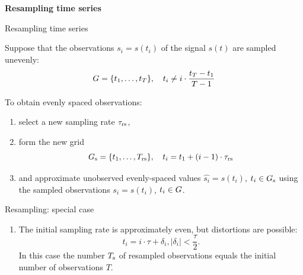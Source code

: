 \documentclass{beamer}
\begin{document}
\begin{frame}
\vfill
\begin{center}
{\Large \bf Resampling time series}
\end{center}
\vfill
\end{frame}
\begin{frame}{Resampling time series}

Suppose that the observations $s_i = s(t_i)$ of the signal $s(t)$ are sampled unevenly:
\[G = \{t_1, \dots, t_T\}, \quad t_i \neq i\cdot\frac{t_T - t_1}{T-1} \]

\bigskip

To obtain evenly spaced observations:
\begin{enumerate}[1)]
\item select a new sampling rate $\tau_{\text{rs}}$,
\item form the new grid
\[G_{\text{s}} = \{t_1, \dots, T_{\text{rs}} \}, \quad t_i  = t_1 + (i-1)\cdot\tau_{\text{rs}} \]
\item and approximate
unobserved evenly-spaced values $\hat{s_i} = s(t_i)$, $t_i \in G_{\text{s}}$ using the sampled observations $s_i = s(t_i)$, $t_i \in G$.
\end{enumerate}

\end{frame}
\begin{frame}{Resampling: special case}

\begin{enumerate}
\item The initial sampling rate is approximately even, but distortions are possible:
\[ t_i = i\cdot\tau + \delta_i, |\delta_i| < \frac{\tau}{2}.\]
In this case the number $T_{\text{s}}$ of resampled observations equals the initial number of observations $T$.
\end{enumerate}



\end{frame}
\end{document}
